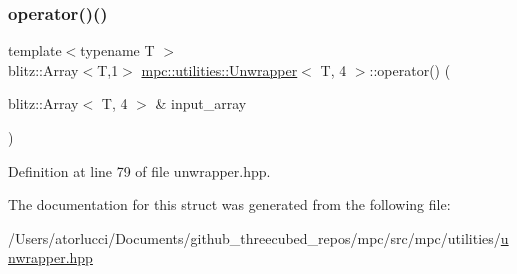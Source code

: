 \subsubsection{\texorpdfstring{operator()()}{operator()()}}
{\footnotesize\ttfamily template$<$typename T $>$ \\
blitz\+::\+Array$<$T,1$>$ \mbox{\hyperlink{structmpc_1_1utilities_1_1_unwrapper}{mpc\+::utilities\+::\+Unwrapper}}$<$ T, 4 $>$\+::operator() (\begin{DoxyParamCaption}\item[{blitz\+::\+Array$<$ T, 4 $>$ \&}]{input\+\_\+array }\end{DoxyParamCaption})\hspace{0.3cm}{\ttfamily [inline]}}



Definition at line 79 of file unwrapper.\+hpp.



The documentation for this struct was generated from the following file\+:\begin{DoxyCompactItemize}
\item 
/\+Users/atorlucci/\+Documents/github\+\_\+threecubed\+\_\+repos/mpc/src/mpc/utilities/\mbox{\hyperlink{unwrapper_8hpp}{unwrapper.\+hpp}}\end{DoxyCompactItemize}

